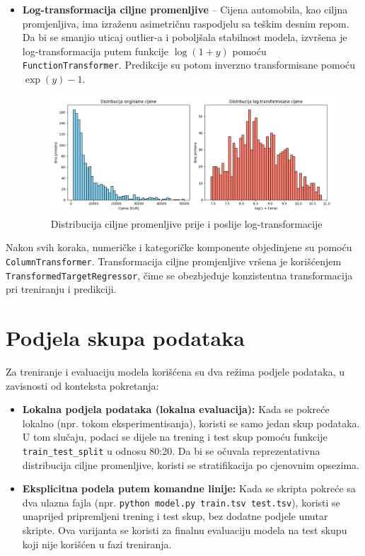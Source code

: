 \documentclass[a4paper,12pt]{article}
\begin{document}
\begin{itemize}
    \item \textbf{Log-transformacija ciljne promenljive} – Cijena automobila, kao ciljna promjenljiva, ima izraženu asimetričnu raspodjelu sa teškim desnim repom. Da bi se smanjio uticaj outlier-a i poboljšala stabilnost modela, izvršena je log-transformacija putem funkcije $\log(1 + y)$ pomoću \texttt{FunctionTransformer}. Predikcije su potom inverzno transformisane pomoću $\exp(y) - 1$.
	\begin{figure}[H]
	    \centering
	    \includegraphics[width=\textwidth]{log_transformacija_cena.png}
	    \caption{Distribucija ciljne promenljive prije i poslije log-transformacije}
	    \label{fig:log_transform}
	\end{figure}
\end{itemize}

Nakon svih koraka, numeričke i kategoričke komponente objedinjene su pomoću \texttt{ColumnTransformer}. Transformacija ciljne promjenljive vršena je korišćenjem \texttt{TransformedTargetRegressor}, čime se obezbjeđuje konzistentna transformacija pri treniranju i predikciji.

\section{Podjela skupa podataka}

Za treniranje i evaluaciju modela korišćena su dva režima podjele podataka, u zavisnosti od konteksta pokretanja:

\begin{itemize}
    \item \textbf{Lokalna podjela podataka (lokalna evaluacija):} Kada se pokreće lokalno (npr. tokom eksperimentisanja), koristi se samo jedan skup podataka. U tom slučaju, podaci se dijele na trening i test skup pomoću funkcije \texttt{train\_test\_split} u odnosu 80:20. Da bi se očuvala reprezentativna distribucija ciljne promenljive, koristi se stratifikacija po cjenovnim opsezima.

    \item \textbf{Eksplicitna podela putem komandne linije:} Kada se skripta pokreće sa dva ulazna fajla (npr. \texttt{python model.py train.tsv test.tsv}), koristi se unaprijed pripremljeni trening i test skup, bez dodatne podjele unutar skripte. Ova varijanta se koristi za finalnu evaluaciju modela na test skupu koji nije korišćen u fazi treniranja.
\end{itemize}
\end{document}
